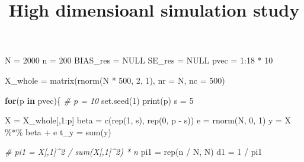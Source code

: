 \documentclass[
]{article}
\title{High dimensioanl simulation study}
\author{}
\date{\vspace{-2.5em}}
\newenvironment{Shaded}{\begin{snugshade}}{\end{snugshade}}
\newcommand{\AttributeTok}[1]{\textcolor[rgb]{0.77,0.63,0.00}{#1}}
\newcommand{\CommentTok}[1]{\textcolor[rgb]{0.56,0.35,0.01}{\textit{#1}}}
\newcommand{\ConstantTok}[1]{\textcolor[rgb]{0.00,0.00,0.00}{#1}}
\newcommand{\ControlFlowTok}[1]{\textcolor[rgb]{0.13,0.29,0.53}{\textbf{#1}}}
\newcommand{\DecValTok}[1]{\textcolor[rgb]{0.00,0.00,0.81}{#1}}
\newcommand{\FunctionTok}[1]{\textcolor[rgb]{0.00,0.00,0.00}{#1}}
\newcommand{\NormalTok}[1]{#1}
\newcommand{\OtherTok}[1]{\textcolor[rgb]{0.56,0.35,0.01}{#1}}
\newcommand{\SpecialCharTok}[1]{\textcolor[rgb]{0.00,0.00,0.00}{#1}}
\begin{document}
\maketitle

\begin{Shaded}
\begin{Highlighting}[]
\NormalTok{N }\OtherTok{=} \DecValTok{2000}
\NormalTok{n }\OtherTok{=} \DecValTok{200}
\NormalTok{BIAS\_res }\OtherTok{=} \ConstantTok{NULL}
\NormalTok{SE\_res }\OtherTok{=} \ConstantTok{NULL}
\NormalTok{pvec }\OtherTok{=} \DecValTok{1}\SpecialCharTok{:}\DecValTok{18} \SpecialCharTok{*} \DecValTok{10}

\NormalTok{X\_whole }\OtherTok{=} \FunctionTok{matrix}\NormalTok{(}\FunctionTok{rnorm}\NormalTok{(N }\SpecialCharTok{*} \DecValTok{500}\NormalTok{, }\DecValTok{2}\NormalTok{, }\DecValTok{1}\NormalTok{), }\AttributeTok{nr =}\NormalTok{ N, }\AttributeTok{nc =} \DecValTok{500}\NormalTok{)}

\ControlFlowTok{for}\NormalTok{(p }\ControlFlowTok{in}\NormalTok{ pvec)\{}
  \CommentTok{\# p = 10}
  \FunctionTok{set.seed}\NormalTok{(}\DecValTok{1}\NormalTok{)}
  \FunctionTok{print}\NormalTok{(p)}
\NormalTok{s }\OtherTok{=} \DecValTok{5}

\NormalTok{X }\OtherTok{=}\NormalTok{ X\_whole[,}\DecValTok{1}\SpecialCharTok{:}\NormalTok{p]}
\NormalTok{beta }\OtherTok{=} \FunctionTok{c}\NormalTok{(}\FunctionTok{rep}\NormalTok{(}\DecValTok{1}\NormalTok{, s), }\FunctionTok{rep}\NormalTok{(}\DecValTok{0}\NormalTok{, p }\SpecialCharTok{{-}}\NormalTok{ s))}
\NormalTok{e }\OtherTok{=} \FunctionTok{rnorm}\NormalTok{(N, }\DecValTok{0}\NormalTok{, }\DecValTok{1}\NormalTok{)}
\NormalTok{y }\OtherTok{=}\NormalTok{ X }\SpecialCharTok{\%*\%}\NormalTok{ beta }\SpecialCharTok{+}\NormalTok{ e}
\NormalTok{t\_y }\OtherTok{=} \FunctionTok{sum}\NormalTok{(y)}

\CommentTok{\# pi1 = X[,1]\^{}2 / sum(X[,1]\^{}2) * n}
\NormalTok{pi1 }\OtherTok{=} \FunctionTok{rep}\NormalTok{(n }\SpecialCharTok{/}\NormalTok{ N, N)}
\NormalTok{d1 }\OtherTok{=} \DecValTok{1} \SpecialCharTok{/}\NormalTok{ pi1}


\end{Highlighting}
\end{Shaded}
\end{document}
